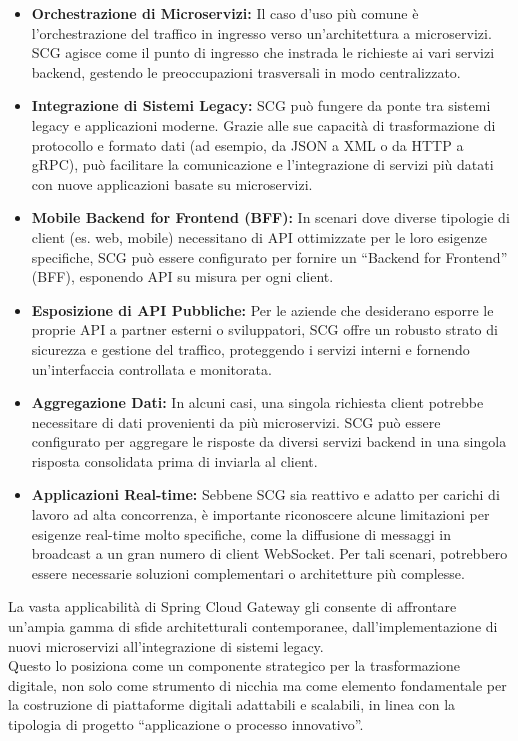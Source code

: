 \begin{itemize}
    \item \textbf{Orchestrazione di Microservizi:} Il caso d'uso più comune è l'orchestrazione del traffico in ingresso verso un'architettura a microservizi. SCG agisce come il punto di ingresso che instrada le richieste ai vari servizi backend, gestendo le preoccupazioni trasversali in modo centralizzato.
    \item \textbf{Integrazione di Sistemi Legacy:} SCG può fungere da ponte tra sistemi legacy e applicazioni moderne. Grazie alle sue capacità di trasformazione di protocollo e formato dati (ad esempio, da JSON a XML o da HTTP a gRPC), può facilitare la comunicazione e l'integrazione di servizi più datati con nuove applicazioni basate su microservizi.
    \item \textbf{Mobile Backend for Frontend (BFF):} In scenari dove diverse tipologie di client (es. web, mobile) necessitano di API ottimizzate per le loro esigenze specifiche, SCG può essere configurato per fornire un \enquote{Backend for Frontend} (BFF), esponendo API su misura per ogni client.
    \item \textbf{Esposizione di API Pubbliche:} Per le aziende che desiderano esporre le proprie API a partner esterni o sviluppatori, SCG offre un robusto strato di sicurezza e gestione del traffico, proteggendo i servizi interni e fornendo un'interfaccia controllata e monitorata.
    \item \textbf{Aggregazione Dati:} In alcuni casi, una singola richiesta client potrebbe necessitare di dati provenienti da più microservizi. SCG può essere configurato per aggregare le risposte da diversi servizi backend in una singola risposta consolidata prima di inviarla al client.
    \item \textbf{Applicazioni Real-time:} Sebbene SCG sia reattivo e adatto per carichi di lavoro ad alta concorrenza, è importante riconoscere alcune limitazioni per esigenze real-time molto specifiche, come la diffusione di messaggi in broadcast a un gran numero di client WebSocket. Per tali scenari, potrebbero essere necessarie soluzioni complementari o architetture più complesse.
\end{itemize}

La vasta applicabilità di Spring Cloud Gateway gli consente di affrontare un'ampia gamma di sfide architetturali contemporanee, dall'implementazione di nuovi microservizi all'integrazione di sistemi legacy. \\
Questo lo posiziona come un componente strategico per la trasformazione digitale, non solo come strumento di nicchia ma come elemento fondamentale per la costruzione di piattaforme digitali adattabili e scalabili, in linea con la tipologia di progetto \enquote{applicazione o processo innovativo}.